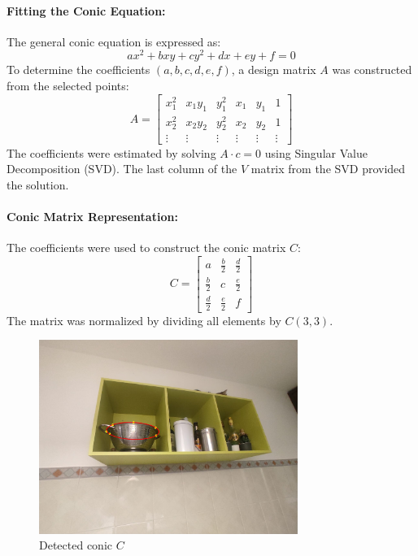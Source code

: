 \paragraph{Fitting the Conic Equation:} The general conic equation is expressed as:
$$
ax^2 + bxy + cy^2 + dx + ey + f = 0
$$
To determine the coefficients $(a, b, c, d, e, f)$, a design matrix $A$ was constructed from the selected points:
$$
A = \begin{bmatrix} 
x_1^2 & x_1y_1 & y_1^2 & x_1 & y_1 & 1 \\
x_2^2 & x_2y_2 & y_2^2 & x_2 & y_2 & 1 \\
\vdots & \vdots & \vdots & \vdots & \vdots & \vdots
\end{bmatrix}
$$
The coefficients were estimated by solving $A \cdot c = 0$ using Singular Value Decomposition (SVD). The last column of the $V$ matrix from the SVD provided the solution.

\paragraph{Conic Matrix Representation:} The coefficients were used to construct the conic matrix $C$:
$$
C = \begin{bmatrix} 
a & \frac{b}{2} & \frac{d}{2} \\ 
\frac{b}{2} & c & \frac{e}{2} \\ 
\frac{d}{2} & \frac{e}{2} & f
\end{bmatrix}
$$
The matrix was normalized by dividing all elements by $C(3, 3)$.

\begin{figure}[H]
    \centering
    \includegraphics[width=0.75\textwidth]{img/imageProcessing/detected_conic.jpg}
    \caption{Detected conic $C$}
    \label{fig:detectedC}
\end{figure}

